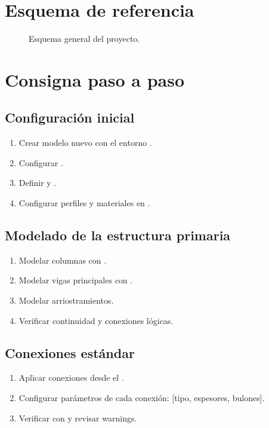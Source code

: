 \documentclass[11pt,a4paper]{article}
\begin{document}
\section{Esquema de referencia}
\begin{figure}[H]
\centering
{}
\caption{Esquema general del proyecto.}
\end{figure}

\section{Consigna paso a paso}

\subsection{Configuración inicial}
\begin{enumerate}
    \item Crear modelo nuevo con el entorno \entornoTekla.
    \item Configurar .
    \item Definir  y .
    \item Configurar perfiles y materiales en .
\end{enumerate}

\subsection{Modelado de la estructura primaria}
\begin{enumerate}
    \item Modelar columnas con .
    \item Modelar vigas principales con .
    \item Modelar arriostramientos.
    \item Verificar continuidad y conexiones lógicas.
\end{enumerate}

\subsection{Conexiones estándar}
\begin{enumerate}
    \item Aplicar conexiones desde el \CC.
    \item Configurar parámetros de cada conexión: [tipo, espesores, bulones].
    \item Verificar con  y revisar warnings.
\end{enumerate}
\end{document}
